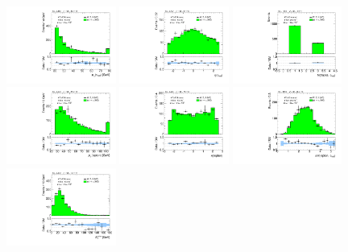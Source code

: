 \begin{figure}[tp]
  \centering
  \includegraphics[width=0.32\textwidth]{figures/analysis/vbf-MCXSR/tau-pt}
  \includegraphics[width=0.32\textwidth]{figures/analysis/vbf-MCXSR/tau-eta}
  \includegraphics[width=0.32\textwidth]{figures/analysis/vbf-MCXSR/tau-numTrack}
  \includegraphics[width=0.32\textwidth]{figures/analysis/vbf-MCXSR/lep-pt-hi}
  \includegraphics[width=0.32\textwidth]{figures/analysis/vbf-MCXSR/lep-eta}
  \includegraphics[width=0.32\textwidth]{figures/analysis/vbf-MCXSR/taulep-dR}
  \includegraphics[width=0.32\textwidth]{figures/analysis/vbf-MCXSR/met-pt-hi}

\end{figure}
